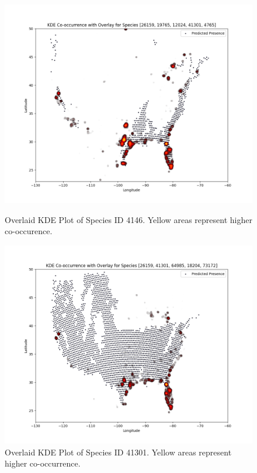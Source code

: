 \documentclass{article}
\begin{document}
\begin{figure}[H]
    \begin{minipage}{0.49\textwidth}
        \includegraphics[width=\textwidth]{figures/4146_Overlay.png}
        \caption{Overlaid KDE Plot of Species ID 4146. Yellow areas represent higher co-occurence.}
        \label{fig:overlay1}
    \end{minipage}\hfill
    \begin{minipage}{0.49\textwidth}
        \includegraphics[width=\textwidth]{figures/41301_Overlay.png}
        \caption{Overlaid KDE Plot of Species ID 41301. Yellow areas represent higher co-occurrence.}
        \label{fig:overlay2}
    \end{minipage}\hfill
\end{figure}
\end{document}

